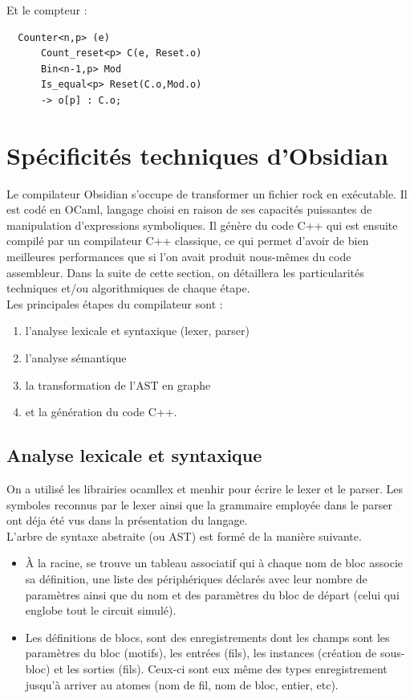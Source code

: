 \documentclass[13pt]{article}
\begin{document}
Et le compteur :
\begin{verbatim}
  Counter<n,p> (e)
      Count_reset<p> C(e, Reset.o)
      Bin<n-1,p> Mod
      Is_equal<p> Reset(C.o,Mod.o)
      -> o[p] : C.o;
\end{verbatim}


\section{Spécificités techniques d'Obsidian}

Le compilateur Obsidian s'occupe de transformer un fichier rock en exécutable.
Il est codé en OCaml, langage choisi en raison de ses capacités puissantes de
manipulation d'expressions symboliques. Il génère du code C++ qui est ensuite
compilé par un compilateur C++ classique, ce qui permet d'avoir de bien
meilleures performances que si l'on avait produit nous-mêmes du code assembleur.
Dans la suite de cette section, on détaillera les particularités techniques et/ou
algorithmiques de chaque étape. \\

Les principales étapes du compilateur sont :
\begin{enumerate}
\item l'analyse lexicale et syntaxique (lexer, parser)
\item l'analyse sémantique
\item la transformation de l'AST en graphe
\item et la génération du code C++.
\end{enumerate}

\subsection{Analyse lexicale et syntaxique}

On a utilisé les librairies ocamllex et menhir pour écrire le lexer et le
parser. Les symboles reconnus par le lexer ainsi que la grammaire employée dans
le parser ont déja été vus dans la présentation du langage. \\ 

L'arbre de syntaxe abstraite (ou AST) est formé de la manière suivante.
\begin{itemize}
\item À la racine, se trouve un tableau associatif qui à chaque nom de bloc associe sa
  définition, une liste des périphériques déclarés avec leur nombre de
  paramètres ainsi que du nom et des paramètres du bloc de départ (celui qui
  englobe tout le circuit simulé).
\item Les définitions de blocs, sont des enregistrements dont les champs sont
  les paramètres du bloc (motifs), les entrées (fils), les instances (création
  de sous-bloc) et les sorties (fils). Ceux-ci sont eux même des types
  enregistrement jusqu'à arriver au atomes (nom de fil, nom de bloc, entier, etc).
\end{itemize}
\end{document}
